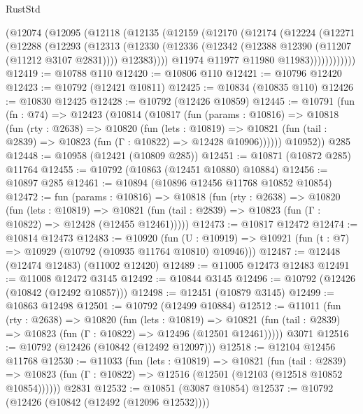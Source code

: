 \begin{lexlean}{RustStd}
\begin{coremodule}
        (@12074
          (@12095
            (@12118
              (@12135
                (@12159
                  (@12170
                    (@12174
                      (@12224
                        (@12271
                          (@12288
                            (@12293
                              (@12313
                                (@12330
                                  (@12336
                                    (@12342 (@12388 @12390 (@11207 (@11212 @3107 @2831))))
                                    @12383))))
                            @11974
                            @11977
                            @11980
                            @11983))))))))))))
@12419 := @10788 @110
@12420 := @10806 @110
@12421 := @10796 @12420
@12423 := @10792 (@12421 @10811)
@12425 := @10834 (@10835 @110)
@12426 := @10830 @12425
@12428 := @10792 (@12426 @10859)
@12445 := @10791
    (fun (fn : @74) =>
    @12423
      (@10814
        (@10817
          (fun (params : @10816) =>
          @10818
            (fun (rty : @2638) =>
            @10820
              (fun (lets : @10819) =>
              @10821 (fun (tail : @2839) => @10823 (fun (Γ : @10822) => @12428 @10906))))))
        @10952))
    @285
@12448 := @10958 (@12421 (@10809 @285))
@12451 := @10871 (@10872 @285) @11764
@12455 := @10792 (@10863 (@12451 @10880) @10884)
@12456 := @10897 @285
@12461 := @10894 (@10896 @12456 @11768 @10852 @10854)
@12472 := fun (params : @10816) =>
  @10818
    (fun (rty : @2638) =>
    @10820
      (fun (lets : @10819) =>
      @10821 (fun (tail : @2839) => @10823 (fun (Γ : @10822) => @12428 (@12455 @12461)))))
@12473 := @10817 @12472
@12474 := @10814 @12473
@12483 := @10920
    (fun (U : @10919) => @10921 (fun (t : @7) => @10929 (@10792 (@10935 @11764 @10810) @10946)))
@12487 := @12448 (@12474 @12483) (@11002 @12420)
@12489 := @11005 @12473 @12483
@12491 := @11008 @12472 @3145
@12492 := @10844 @3145
@12496 := @10792 (@12426 (@10842 (@12492 @10857)))
@12498 := @12451 (@10879 @3145)
@12499 := @10863 @12498
@12501 := @10792 (@12499 @10884)
@12512 := @11011
    (fun (rty : @2638) =>
    @10820
      (fun (lets : @10819) =>
      @10821 (fun (tail : @2839) => @10823 (fun (Γ : @10822) => @12496 (@12501 @12461)))))
    @3071
@12516 := @10792 (@12426 (@10842 (@12492 @12097)))
@12518 := @12104 @12456 @11768
@12530 := @11033
    (fun (lets : @10819) =>
    @10821
      (fun (tail : @2839) =>
      @10823 (fun (Γ : @10822) => @12516 (@12501 (@12103 (@12518 @10852 @10854))))))
    @2831
@12532 := @10851 (@3087 @10854)
@12537 := @10792 (@12426 (@10842 (@12492 (@12096 @12532))))

\end{coremodule}
\end{lexlean}
